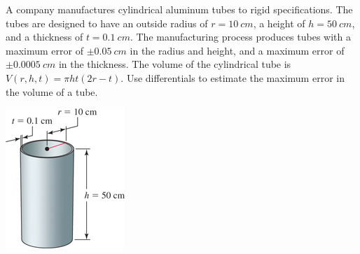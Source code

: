 \documentclass[mathNotesPreamble]{subfiles}
\begin{document}
  \begin{minipage}{0.775\linewidth}
    \begin{ex*}
      A company manufactures cylindrical aluminum tubes to rigid specifications. The tubes are designed to have an outside radius of $r=10\ cm$, a height of $h=50\ cm$, and a thickness of $t=0.1\ cm$. The manufacturing process produces tubes with a maximum error of $\pm0.05\ cm$ in the radius and height, and a maximum error of $\pm 0.0005\ cm$ in the thickness. The volume of the cylindrical tube is $V(r,h,t)=\pi ht(2r-t)$. Use differentials to estimate the maximum error in the volume of a tube.
    \end{ex*}
  \end{minipage}%
  \begin{minipage}{0.225\linewidth}
    \begin{flushright}
      \includegraphics[width=0.9\linewidth]{images/briggs_15_06/fig15_66}
    \end{flushright}
  \end{minipage}
  \pagebreak

  
\end{document}
